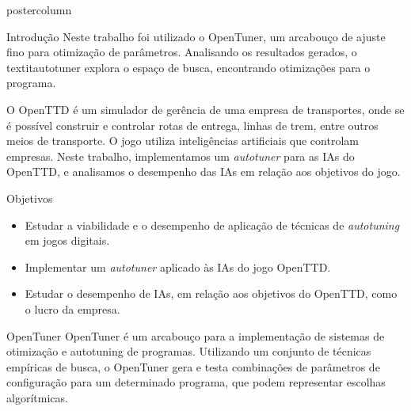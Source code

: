 \documentclass[final]{beamer}
\begin{document}
\begin{frame}
\begin{columns}
\begin{column}{.5\textwidth}
\begin{beamercolorbox}[center,wd=\textwidth]{postercolumn}
\begin{minipage}[T]{.95\textwidth}
{\begin{block}{Introdução}
                Neste trabalho foi utilizado o OpenTuner, um arcabouço de ajuste fino para otimização de parâmetros. Analisando os resultados gerados, o textit{autotuner} explora o espaço de busca, encontrando otimizações para o programa.
                
                \vspace*{0.15cm}
                
                O OpenTTD é um simulador de gerência de uma empresa de transportes, onde se é possível construir e controlar rotas de entrega, linhas de trem, entre outros meios de transporte. O jogo utiliza inteligências artificiais que controlam empresas. Neste trabalho, implementamos um \textit{autotuner} para as IAs do OpenTTD, e analisamos o desempenho das IAs em relação aos objetivos do jogo.

                
            \end{block}
            
            \vspace*{0.2cm}

            \begin{block}{Objetivos}
              \justifying
              \begin{itemize}
                \item Estudar a viabilidade e o desempenho de aplicação de técnicas de \textit{autotuning} em jogos digitais.
                \item Implementar um \textit{autotuner} aplicado às IAs do jogo OpenTTD.
                \item Estudar o desempenho de IAs, em relação aos objetivos do OpenTTD, como o lucro da empresa.
              \end{itemize}
              \vspace*{0.2cm} 
            \end{block}
            
            \vspace*{0.2cm}

            \begin{block}{OpenTuner}
            \justifying
                OpenTuner é um arcabouço para a implementação de sistemas de otimização e autotuning de programas. Utilizando um conjunto de técnicas empíricas de busca, o OpenTuner gera e testa combinações de parâmetros de configuração para um determinado programa, que podem representar escolhas algorítmicas. 
                

\end{block}}
\end{minipage}
\end{beamercolorbox}
\end{column}
\end{columns}
\end{frame}
\end{document}
